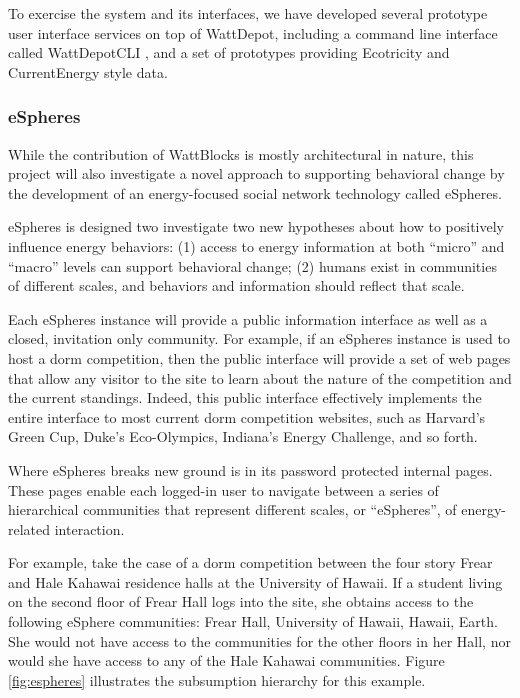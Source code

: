 To exercise the system
and its interfaces, we have developed several prototype user interface
services on top of WattDepot, including a command line interface called
WattDepotCLI \cite{WattDepotCLI}, and a set of prototypes providing Ecotricity and
CurrentEnergy style data.  




\subsubsection{eSpheres}

While the contribution of WattBlocks is mostly architectural in nature,
this project will also investigate a novel approach to supporting
behavioral change by the development of an energy-focused social network
technology called eSpheres.

eSpheres is designed two investigate two new hypotheses about how to
positively influence energy behaviors: (1) access to energy information at
both ``micro'' and ``macro'' levels can support behavioral change; (2)
humans exist in communities of different scales, and behaviors and
information should reflect that scale.

Each eSpheres instance will provide a public information interface as well
as a closed, invitation only community.  For example, if an eSpheres
instance is used to host a dorm competition, then the public interface will
provide a set of web pages that allow any visitor to the site to learn
about the nature of the competition and the current standings.  Indeed,
this public interface effectively implements the entire interface to most
current dorm competition websites, such as Harvard's Green Cup, Duke's
Eco-Olympics, Indiana's Energy Challenge, and so forth. 

Where eSpheres breaks new ground is in its password protected internal
pages.  These pages enable each logged-in user to navigate between a series
of hierarchical communities that represent different scales, or
``eSpheres'', of energy-related interaction.

For example, take the case of a dorm competition between the four story
Frear and Hale Kahawai residence halls at the University of Hawaii. If a
student living on the second floor of Frear Hall logs into the site, she
obtains access to the following eSphere communities: Frear Hall, University
of Hawaii, Hawaii, Earth.  She would not have access to the communities for
the other floors in her Hall, nor would she have access to any of the Hale
Kahawai communities.  Figure \ref{fig:espheres} illustrates the subsumption
hierarchy for this example.


